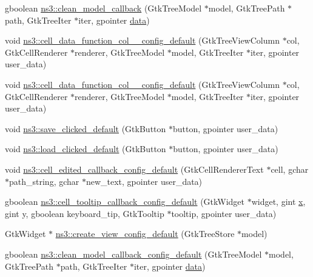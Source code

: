 \begin{DoxyCompactItemize}
\item 
gboolean \hyperlink{namespacens3_a12e280cbcb12ad1955d5ee0cca1cff47}{ns3\+::clean\+\_\+model\+\_\+callback} (Gtk\+Tree\+Model $\ast$model, Gtk\+Tree\+Path $\ast$path, Gtk\+Tree\+Iter $\ast$iter, gpointer \hyperlink{topology-example-sim_8cc_a26c65296e316af77b787dc77469bb2a4}{data})
\item 
void \hyperlink{namespacens3_a05481812e836368172135641dbada4b8}{ns3\+::cell\+\_\+data\+\_\+function\+\_\+col\+\_\+\_\+config\+\_\+default} (Gtk\+Tree\+View\+Column $\ast$col, Gtk\+Cell\+Renderer $\ast$renderer, Gtk\+Tree\+Model $\ast$model, Gtk\+Tree\+Iter $\ast$iter, gpointer user\+\_\+data)
\item 
void \hyperlink{namespacens3_a18dc38f97b2252c3e10d44f9dbbe366b}{ns3\+::cell\+\_\+data\+\_\+function\+\_\+col\+\_\+\_\+config\+\_\+default} (Gtk\+Tree\+View\+Column $\ast$col, Gtk\+Cell\+Renderer $\ast$renderer, Gtk\+Tree\+Model $\ast$model, Gtk\+Tree\+Iter $\ast$iter, gpointer user\+\_\+data)
\item 
void \hyperlink{namespacens3_ae70b84ab7090f1eaa73e7209be9400d2}{ns3\+::save\+\_\+clicked\+\_\+default} (Gtk\+Button $\ast$button, gpointer user\+\_\+data)
\item 
void \hyperlink{namespacens3_af500ab6459ed7099c0e403a504f9339e}{ns3\+::load\+\_\+clicked\+\_\+default} (Gtk\+Button $\ast$button, gpointer user\+\_\+data)
\item 
void \hyperlink{namespacens3_ac95d50f779140a767284d124cfea71eb}{ns3\+::cell\+\_\+edited\+\_\+callback\+\_\+config\+\_\+default} (Gtk\+Cell\+Renderer\+Text $\ast$cell, gchar $\ast$path\+\_\+string, gchar $\ast$new\+\_\+text, gpointer user\+\_\+data)
\item 
gboolean \hyperlink{namespacens3_a614e487215e562d0b6ac0b3b3f443f20}{ns3\+::cell\+\_\+tooltip\+\_\+callback\+\_\+config\+\_\+default} (Gtk\+Widget $\ast$widget, gint \hyperlink{lte__link__budget__x2__handover__measures_8m_a9336ebf25087d91c818ee6e9ec29f8c1}{x}, gint y, gboolean keyboard\+\_\+tip, Gtk\+Tooltip $\ast$tooltip, gpointer user\+\_\+data)
\item 
Gtk\+Widget $\ast$ \hyperlink{namespacens3_a9b0de38431169a0ec08415d6f1a2fa67}{ns3\+::create\+\_\+view\+\_\+config\+\_\+default} (Gtk\+Tree\+Store $\ast$model)
\item 
gboolean \hyperlink{namespacens3_a9c65740963efd473d9039ae16aa3a408}{ns3\+::clean\+\_\+model\+\_\+callback\+\_\+config\+\_\+default} (Gtk\+Tree\+Model $\ast$model, Gtk\+Tree\+Path $\ast$path, Gtk\+Tree\+Iter $\ast$iter, gpointer \hyperlink{topology-example-sim_8cc_a26c65296e316af77b787dc77469bb2a4}{data})
\end{DoxyCompactItemize}
